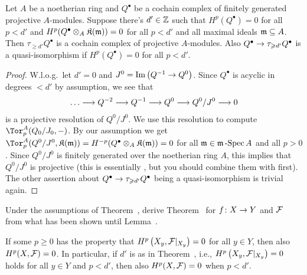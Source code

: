 \documentclass[a4paper,parskip=half,numbers=enddot, DIV=12]{scrreprt}
\renewcommand{\geq}{\geqslant}
\begin{document}
\begin{lem}
	Let $A$ be a noetherian ring and $Q^\bullet$ be a cochain complex of finitely generated projective $A$-modules. Suppose there's $d'\in\mathbb{Z}$ such that $H^p(Q^\bullet)=0$ for all $p<d'$ and $H^p(Q^\bullet\otimes_A\mathfrak{K}(\mathfrak{m}))=0$ for all $p<d'$ and all maximal ideals $\mathfrak{m}\subseteq A$. Then $\tau_{\geq d'}Q^\bullet$ is a cochain complex of projective $A$-modules. Also $Q^\bullet\morphism \tau_{\geq d'}Q^\bullet$ is a quasi-isomorphism if $H^p(Q^\bullet)=0$ for all $p< d'$.
\end{lem}
\begin{proof}
	W.l.o.g.\ let $d'=0$ and $J^0=\Im\left(Q^{-1}\morphism Q^0\right)$. Since $Q^\bullet$ is acyclic in degrees $<d'$ by assumption, we see that
	\begin{align*}
		\ldots \morphism Q^{-2}\morphism Q^{-1}\morphism Q^0\morphism Q^0/J^0\morphism 0
	\end{align*}
	is a projective resolution of $Q^0/J^0$. We use this resolution to compute $\Tor_p^A(Q_0/J_0,-)$. By our assumption we get $\Tor_p^A(Q^0/J^0,\KK(\mm))=H^{-p}(Q^\bullet\otimes_A\KK(\mm))=0$ for all $\mathfrak{m}\in\mathfrak{m}\operatorname{-Spec} A$ and all $p>0$. Since $Q^0/J^0$ is finitely generated over the noetherian ring $A$, this implies that $Q^0/J^0$ is projective (this is essentially \cite[Propositions~1.3.1 and~1.3.2]{homalg}, but you should combine them with \cite[Fact~1.2.4]{homalg} first). The other assertion about $Q^\bullet\morphism \tau_{\geq d'}Q^\bullet$ being a quasi-isomorphism is trivial again.
\end{proof}
\begin{exc}
	Under the assumptions of Theorem~, derive Theorem~ for $f\colon X\morphism Y$ and $\mathcal{F}$ from what has been shown until Lemma~.
\end{exc}
\begin{lem}
	If some $p\geq 0$ has the property that $H^p\left(X_y,\mathcal{F}|_{X_y}\right)=0$ for all $y\in Y$, then also $H^p(X,\mathcal{F})=0$. In particular,
	if $d'$ is as in Theorem~, i.e., $H^p\left(X_y,\mathcal{F}|_{X_y}\right)=0$ holds for all $y\in Y$ and $p<d'$, then also $H^p(X,\mathcal{F})=0$ when $p<d'$.
\end{lem}
\end{document}
